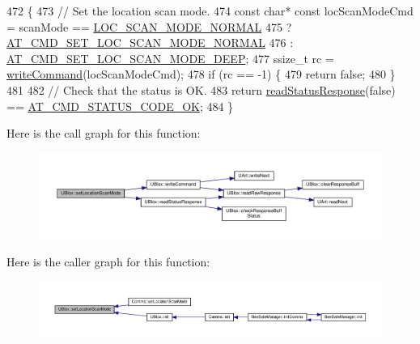 \begin{DoxyCode}
472 \{
473     \textcolor{comment}{// Set the location scan mode.}
474     \textcolor{keyword}{const} \textcolor{keywordtype}{char}* \textcolor{keyword}{const} locScanModeCmd = scanMode == \hyperlink{_u_blox_8h_a57e74368f6c6813ceb64f972eba4a5f3}{LOC\_SCAN\_MODE\_NORMAL}
475                                        ? \hyperlink{_u_blox_8cpp_a70bd8532253bd43bd141f2414fba190c}{AT\_CMD\_SET\_LOC\_SCAN\_MODE\_NORMAL}
476                                        : \hyperlink{_u_blox_8cpp_a7862985fe9289d8f07cd461ed60c1986}{AT\_CMD\_SET\_LOC\_SCAN\_MODE\_DEEP};
477     ssize\_t rc = \hyperlink{class_u_blox_af604d1897a66192bf1c2a11997f2634d}{writeCommand}(locScanModeCmd);
478     \textcolor{keywordflow}{if} (rc == -1) \{
479         \textcolor{keywordflow}{return} \textcolor{keyword}{false};
480     \}
481 
482     \textcolor{comment}{// Check that the status is OK.}
483     \textcolor{keywordflow}{return} \hyperlink{class_u_blox_a4eaca5b1b1c4b5b6f6164b220dd43e0b}{readStatusResponse}(\textcolor{keyword}{false}) == \hyperlink{_u_blox_8cpp_a6ebc1682eb6b9964fccb4a61688ff307}{AT\_CMD\_STATUS\_CODE\_OK};
484 \}
\end{DoxyCode}
Here is the call graph for this function\+:
\nopagebreak
\begin{figure}[H]
\begin{center}
\leavevmode
\includegraphics[width=350pt]{da/df6/class_u_blox_aabed44fd41e16c9d1a8daba80f3bef06_cgraph}
\end{center}
\end{figure}
Here is the caller graph for this function\+:
\nopagebreak
\begin{figure}[H]
\begin{center}
\leavevmode
\includegraphics[width=350pt]{da/df6/class_u_blox_aabed44fd41e16c9d1a8daba80f3bef06_icgraph}
\end{center}
\end{figure}
\mbox{\label{class_u_blox_a12c1042d3bcb503b025927fd53d54243}} 
